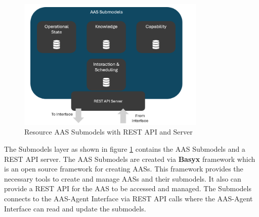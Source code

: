 \newpage
{}
\begin{figure}[h]
    \centering
    \includegraphics[width=0.8\textwidth]{Images/Resource_Agent_Submodels_Arch_Overview.png}
    \caption{Resource AAS Submodels with REST API and Server}
    \label{fig:resource_aas_submodels_rest_api}
\end{figure}

The Submodels layer as shown in figure \ref{fig:resource_aas_submodels_rest_api} contains the AAS Submodels and a REST API server.
The AAS Submodels are created via \textbf{Basyx} framework which is an open source framework for creating AASs.
This framework provides the necessary tools to create and manage AASs and their submodels.
It also can provide a REST API for the AAS to be accessed and managed.
The Submodels connects to the AAS-Agent Interface via REST API calls where the AAS-Agent Interface can read and update the submodels.

